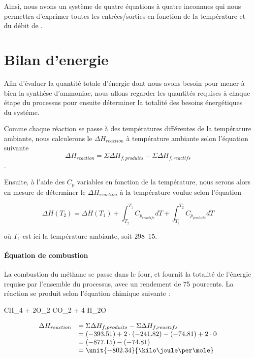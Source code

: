 Ainsi, nous avons un système de quatre équations à quatre inconnues qui nous permettra d'exprimer
toutes les entrées/sorties en fonction de la température et du débit de . 
   
\section{Bilan d'energie}
Afin d'évaluer la quantité totale d'énergie dont nous avons besoin pour mener à 
bien la synthèse d'ammoniac, nous allons regarder les quantités requises à chaque 
étape du processus pour ensuite déterminer la totalité des besoins énergétiques du
systéme.

Comme chaque réaction se passe à des températures différentes de la température ambiante,
nous calculerons le $\Delta H_{reaction}$ à température ambiante selon l'équation suivante 
$$\Delta H_{reaction} = \Sigma \Delta H_{f,produits} - \Sigma \Delta H_{f,reactifs}$$.

Ensuite, à l'aide des $C_{p}$ variables en fonction de la température, nous serons alors en 
mesure de déterminer le $\Delta H_{reaction}$ à la température voulue selon l'équation

$$\Delta H(T_2) = \Delta H(T_{1}) 
+ \int_{T_2}^{T_1} C_{p_{reactifs}} dT + \int_{T_1}^{T_2} C_{p_{produits}} dT$$ 

où $T_1$ est ici la température ambiante, soit \unit{298.15}{\kelvin}.

\paragraph{\'Equation de combustion}
La combustion du méthane se passe dans le four, et fournit la totalité de l'énergie 
requise par l'ensemble du processus, avec un rendement de 75 pourcents.
La réaction se produit selon l'équation chimique suivante :

\begin{chemmath}
	CH_4 + 2O_2 \Longrightarrow CO_2 + 4 H_2O
\end{chemmath}

$$
	\begin{array}{rl}
	\Delta H_{reaction}		&=  \Sigma \Delta H_{f,produits} - \Sigma \Delta H_{f,reactifs} \\
												&=  (-393.51) + 2\cdot(-241.82) - (-74.81) + 2\cdot0 \\
												&=  (-877.15) - (-74.81)\\
												&=  \unit{-802.34}{\kilo\joule\per\mole}
	\end{array}
$$

